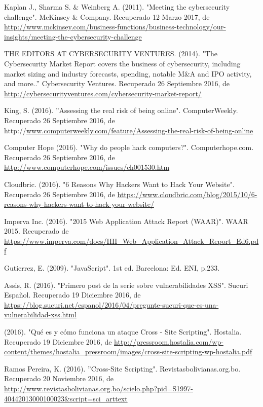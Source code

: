 
\begin{thebibliography}{99}


 Kaplan J., Sharma S. \& Weinberg A. (2011). "Meeting the cybersecurity challenge". McKinsey \& Company. Recuperado 12 Marzo 2017, de \url{http://www.mckinsey.com/business-functions/business-technology/our-insights/meeting-the-cybersecurity-challenge}

 THE EDITORS AT CYBERSECURITY VENTURES. (2014). "The Cybersecurity Market Report covers the business of cybersecurity, including market sizing and industry forecasts, spending, notable M\&A and IPO activity, and more..'' Cybersecurity Ventures. Recuperado 26 Septiembre 2016, de \url{http://cybersecurityventures.com/cybersecurity-market-report/}

 King, S. (2016). ''Assessing the real risk of being online". ComputerWeekly. Recuperado 26 Septiembre 2016, de http://\url{www.computerweekly.com/feature/Assessing-the-real-risk-of-being-online}

 Computer Hope (2016). "Why do people hack computers?". Computerhope.com. Recuperado 26 Septiembre 2016, de \url{http://www.computerhope.com/issues/ch001530.htm}

 Cloudbric. (2016). "6 Reasons Why Hackers Want to Hack Your Website". Recuperado 26 Septiembre 2016, de \url{https://www.cloudbric.com/blog/2015/10/6-reasons-why-hackers-want-to-hack-your-website/}

 Imperva Inc. (2016). "2015 Web Application Attack Report (WAAR)". WAAR 2015. Recuperado de \url{https://www.imperva.com/docs/HII\_Web\_Application\_Attack\_Report\_Ed6.pdf}

 Gutierrez, E. (2009). "JavaScript". 1st ed. Barcelona: Ed. ENI, p.233.

 Assis, R. (2016). "Primero post de la serie sobre vulnerabilidades XSS". Sucuri Español. Recuperado 19 Diciembre 2016, de \url{https://blog.sucuri.net/espanol/2016/04/pregunte-sucuri-que-es-una-vulnerabilidad-xss.html}

 (2016). "Qué es y cómo funciona un ataque Cross - Site Scripting". Hostalia. Recuperado 19 Diciembre 2016, de \url{http://pressroom.hostalia.com/wp-content/themes/hostalia\_pressroom/images/cross-site-scripting-wp-hostalia.pdf}

 Ramos Pereira, K. (2016). ''Cross-Site Scripting". Revistasbolivianas.org.bo. Recuperado 20 Noviembre 2016, de \url{http://www.revistasbolivianas.org.bo/scielo.php?pid=S1997-40442013000100023\&script=sci\_arttext}


\end{thebibliography}
